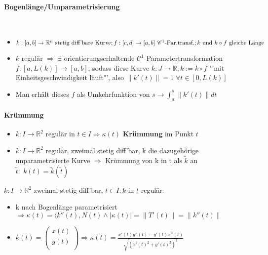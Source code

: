 \documentclass[paper=a3,paper=landscape, fontsize=9pt,DIV=30]{scrartcl}
\newcommand{\real}{{\mathbb{R}}}
\begin{document}
\begin{multicols*}{4}
  \paragraph{Bogenlänge/Umparametrisierung}\hspace{0pt} \\
\begin{itemize}
	\item   $k: [a,b] \rightarrow \real^n \ \text{stetig diff'bare Kurve};\\ f:[c,d] \rightarrow [a,b] \ \mathscr{C}^1\text{-Par.transf.}; k \ \text{und}\ k \circ f \ \text{gleiche Länge} $
	\item $k$ regulär $\Rightarrow\;\exists$ orientierungserhaltende $\mathscr{C}^1$-Parametertransformation $f : [a,L(k)] \rightarrow [a,b]$, sodass diese Kurve $k: J \rightarrow \real, k := k \circ f$ "'mit Einheitsgeschwindigkeit läuft"', also $\lVert k'(t) \rVert = 1 \; \forall t \in [0,L(k)]$
	\item Man erhält dieses $f$ als Umkehrfunktion von $s \rightarrow \int_{a}^{s} \lVert k'(t)\rVert dt$
\end{itemize}

  \paragraph{Krümmung}
  \begin{itemize}
  	\item $k: I \rightarrow \real^2$ regulär in $t \in I \Rightarrow \kappa(t)$ \textbf{Krümmung} im Punkt $t$
  	\item $k: I \rightarrow \real^2$ regulär, zweimal stetig diff'bar, k die dazugehörige unparametrisierte Kurve $\Rightarrow$ Krümmung von k in t als $\tilde{k}$ an $\tilde{t}:\;k(t)=\tilde{k}(\tilde{t})$
  \end{itemize}
	$k: I \rightarrow \real^2$ zweimal stetig diff'bar, $t \in I: k$ in $t$ regulär:
	\begin{itemize}
		\item k nach Bogenlänge parametrisiert $\Rightarrow \kappa(t)=\langle k''(t), N(t) \wedge \lvert \kappa(t)\rvert = \lVert T'(t) \rVert = \lVert k''(t) \rVert$
		\item $k(t) =
		\begin{pmatrix}
			x(t)\\y(t)\\
		\end{pmatrix}
		\Rightarrow \kappa(t)=\frac{x'(t)y''(t)-y'(t)x''(t)}{\sqrt{(x'(t)^2+y'(t)^2)^3}}$
	\end{itemize}

\end{multicols*}
\end{document}
